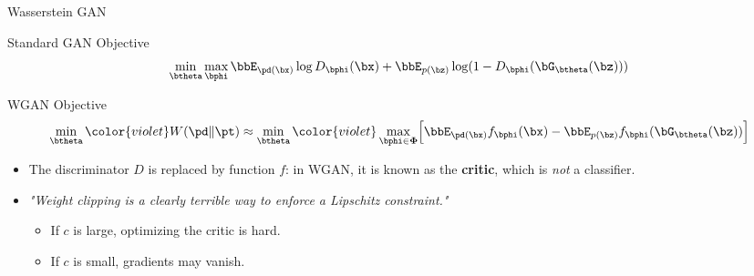 \documentclass{beamer}
\begin{document}
\begin{frame}{Wasserstein GAN}
	\begin{block}{Standard GAN Objective}
		\vspace{-0.2cm}
		\[
			\min_{\btheta} \max_{\bphi} \bbE_{\pd(\bx)} \log D_{\bphi}(\bx) + \bbE_{p(\bz)} \log (1 - D_{\bphi}(\bG_{\btheta}(\bz)))
		\]
		\vspace{-0.3cm}
	\end{block}
	\begin{block}{WGAN Objective}
		\vspace{-0.3cm}
		\[
			\min_{\btheta} {\color{violet}W(\pd \| \pt)} \approx \min_{\btheta} {\color{violet}\max_{\bphi \in \boldsymbol{\Phi}} \Bigl[ \bbE_{\pd(\bx)} f_{\bphi}(\bx)  - \bbE_{p(\bz)} f_{\bphi}(\bG_{\btheta}(\bz))\Bigr]}
		\]
		\vspace{-0.3cm}
	\end{block}
	\eqpause
	\begin{itemize}
		\item The discriminator $D$ is replaced by function $f$: in WGAN, it is known as the \textbf{critic}, which is \emph{not} a classifier.
		\item \textit{"Weight clipping is a clearly terrible way to enforce a Lipschitz constraint."}
		\begin{itemize}
			\item If $c$ is large, optimizing the critic is hard.
			\item If $c$ is small, gradients may vanish.
		\end{itemize}
	\end{itemize}	
\end{frame}
\end{document}
